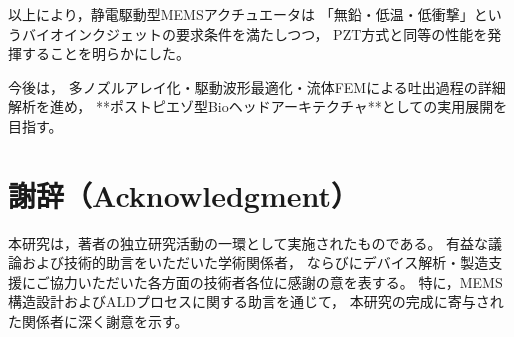 \documentclass[conference]{IEEEtran}
\begin{document}
以上により，静電駆動型MEMSアクチュエータは
「無鉛・低温・低衝撃」というバイオインクジェットの要求条件を満たしつつ，
PZT方式と同等の性能を発揮することを明らかにした。

今後は，
多ノズルアレイ化・駆動波形最適化・流体FEMによる吐出過程の詳細解析を進め，
**ポストピエゾ型Bioヘッドアーキテクチャ**としての実用展開を目指す。

\section*{謝辞（Acknowledgment）}
本研究は，著者の独立研究活動の一環として実施されたものである。
有益な議論および技術的助言をいただいた学術関係者，
ならびにデバイス解析・製造支援にご協力いただいた各方面の技術者各位に感謝の意を表する。
特に，MEMS構造設計およびALDプロセスに関する助言を通じて，
本研究の完成に寄与された関係者に深く謝意を示す。
\end{document}
